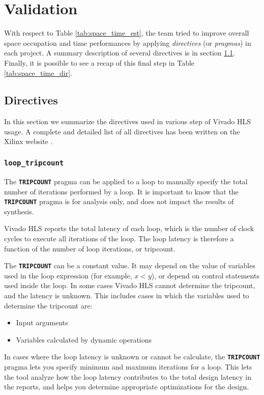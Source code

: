 \chapter{Validation}
\label{chapter:validation}
With respect to Table \ref{tab:space_time_est}, the team tried to improve overall space occupation and time performances by applying \emph{directives} (or \emph{pragmas}) in each project. A summary description of several directives is in section \ref{sec:directives}. Finally, it is possible to see a recap of this final step in Table \ref{tab:space_time_dir}.

\section{Directives}
\label{sec:directives}

In this section we summarize the directives used in various step of Vivado HLS usage. A complete and detailed list of all directives has been written on the Xilinx website \cite{xilinx_directives}.

\subsection{\texttt{loop\_tripcount}}

The \texttt{\textbf{TRIPCOUNT}} pragma can be applied to a loop to manually specify the total number of iterations performed by a loop. It is important to know that the \texttt{\textbf{TRIPCOUNT}} pragma is for analysis only, and does not impact the results of synthesis.

Vivado HLS reports the total latency of each loop, which is the number of clock cycles to execute all iterations of the loop. The loop latency is therefore a function of the number of loop iterations, or tripcount.

The \texttt{\textbf{TRIPCOUNT}} can be a constant value. It may depend on the value of variables used in the loop expression (for example, $x<y$), or depend on control statements used inside the loop. In some cases Vivado HLS cannot determine the tripcount, and the latency is unknown. This includes cases in which the variables used to determine the tripcount are:
\begin{itemize} [noitemsep]
	\item Input arguments
	\item Variables calculated by dynamic operations
\end{itemize}

In cases where the loop latency is unknown or cannot be calculate, the \texttt{\textbf{TRIPCOUNT}} pragma lets you specify minimum and maximum iterations for a loop. This lets the tool analyze how the loop latency contributes to the total design latency in the reports, and helps you determine appropriate optimizations for the design.

